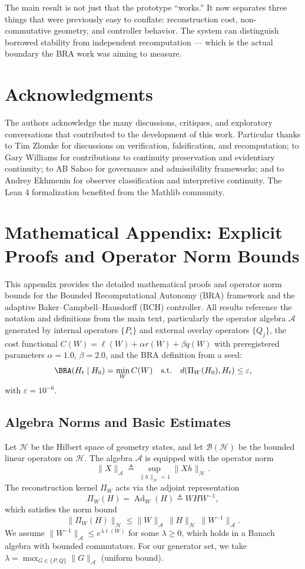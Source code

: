 \documentclass[12pt]{article}
\theoremstyle{plain}
\theoremstyle{definition}
\theoremstyle{remark}
\begin{document}
The main result is not just that the prototype ``works.'' It now separates three things that were previously easy to conflate: reconstruction cost, non-commutative geometry, and controller behavior. The system can distinguish borrowed stability from independent recomputation — which is the actual boundary the BRA work was aiming to measure.

\section*{Acknowledgments}

The authors acknowledge the many discussions, critiques, and exploratory conversations that contributed to the development of this work. Particular thanks to Tim Zlomke for discussions on verification, falsification, and recomputation; to Gary Williams for contributions to continuity preservation and evidentiary continuity; to AB Sahoo for governance and admissibility frameworks; and to Andrey Ekhmenin for observer classification and interpretive continuity. The Lean 4 formalization benefited from the Mathlib community.

\appendix
\section{Mathematical Appendix: Explicit Proofs and Operator Norm Bounds}

This appendix provides the detailed mathematical proofs and operator norm bounds for the Bounded Recomputational Autonomy (BRA) framework and the adaptive Baker–Campbell–Hausdorff (BCH) controller. All results reference the notation and definitions from the main text, particularly the operator algebra $\mathcal{A}$ generated by internal operators $\{P_i\}$ and external overlay operators $\{Q_j\}$, the cost functional $C(W)=\ell(W)+\alpha r(W)+\beta q(W)$ with preregistered parameters $\alpha=1.0$, $\beta=2.0$, and the BRA definition from a seed:
\[
\BRA(H_t \mid H_0) = \min_{W} C(W) \quad \text{s.t.} \quad d(\Pi_W(H_0), H_t) \le \varepsilon,
\]
with $\varepsilon = 10^{-6}$.

\subsection{Algebra Norms and Basic Estimates}

Let $\mathcal{H}$ be the Hilbert space of geometry states, and let $\mathcal{B}(\mathcal{H})$ be the bounded linear operators on $\mathcal{H}$. The algebra $\mathcal{A}$ is equipped with the operator norm
\[
\|X\|_{\mathcal{A}} \triangleq \sup_{\|h\|_{\mathcal{H}}=1} \|X h\|_{\mathcal{H}}.
\]
The reconstruction kernel $\Pi_W$ acts via the adjoint representation
\[
\Pi_W(H) = \operatorname{Ad}_W(H) \triangleq W H W^{-1},
\]
which satisfies the norm bound
\[
\|\Pi_W(H)\|_{\mathcal{H}} \le \|W\|_{\mathcal{A}} \, \|H\|_{\mathcal{H}} \, \|W^{-1}\|_{\mathcal{A}}.
\]
We assume $\|W^{-1}\|_{\mathcal{A}} \le e^{\lambda \ell(W)}$ for some $\lambda \ge 0$, which holds in a Banach algebra with bounded commutators. For our generator set, we take $\lambda = \max_{G\in\{P,Q\}} \|G\|_{\mathcal{A}}$ (uniform bound).
\end{document}
